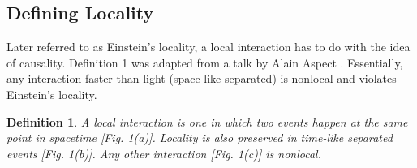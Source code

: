 \documentclass[%
 aip,
cp,  %
 amsmath,amssymb,%
 reprint,%
]{revtex4-2}
\newtheorem{definition}{Definition}
\begin{document}
    \subsection{Defining Locality}
        Later referred to as Einstein's locality, a local interaction has to do with the idea of causality. Definition 1 was adapted from a talk by Alain Aspect \cite{aspect}. Essentially, any interaction faster than light (space-like separated) is nonlocal and violates Einstein's locality.
        \begin{definition} \label{def:local} 
            A local interaction is one in which two events happen at the same point in spacetime [Fig. 1(a)]. Locality is also preserved in time-like separated events [Fig. 1(b)]. Any other interaction [Fig. 1(c)] is nonlocal.
        \end{definition}
\end{document}
